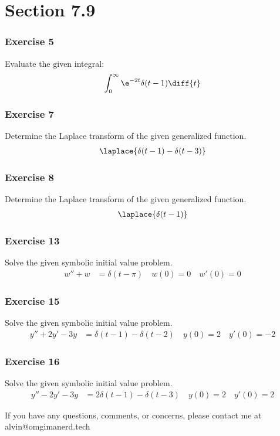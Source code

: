 \documentclass{math}
\begin{document}
\section*{Section 7.9}

\subsubsection*{Exercise 5}
Evaluate the given integral:
\begin{align*}
  \int_{0}^{\infty}\e^{-2t}\delta(t-1)\diff{t}
\end{align*}

\subsubsection*{Exercise 7}
Determine the Laplace transform of the given generalized function.
\begin{align*}
  \laplace{\delta(t-1)-\delta(t-3)}
\end{align*}

\subsubsection*{Exercise 8}
Determine the Laplace transform of the given generalized function.
\begin{align*}
  \laplace{\delta(t-1)}
\end{align*}

\subsubsection*{Exercise 13}
Solve the given symbolic initial value problem.
\begin{align*}
  w''+w &= \delta(t-\pi) \quad w(0) = 0 \quad w'(0) = 0
\end{align*}

\subsubsection*{Exercise 15}
Solve the given symbolic initial value problem.
\begin{align*}
  y''+2y'-3y &= \delta(t-1)-\delta(t-2) \quad y(0) = 2 \quad y'(0) = -2
\end{align*}

\subsubsection*{Exercise 16}
Solve the given symbolic initial value problem.
\begin{align*}
  y''-2y'-3y &= 2\delta(t-1)-\delta(t-3) \quad y(0) = 2 \quad y'(0) = 2
\end{align*}

\begin{center}
  If you have any questions, comments, or concerns, please contact me at
  alvin@omgimanerd.tech
\end{center}
\end{document}
